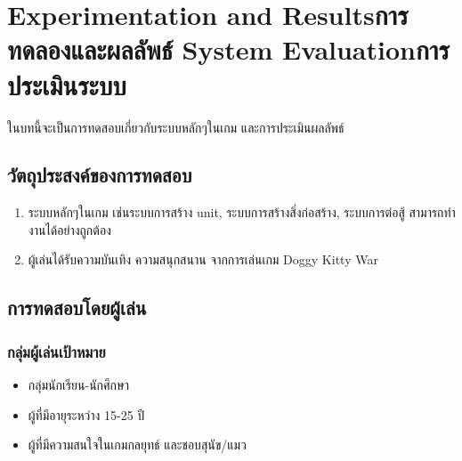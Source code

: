 \chapter{\ifproject%
\ifenglish Experimentation and Results\else การทดลองและผลลัพธ์\fi
\else%
\ifenglish System Evaluation\else การประเมินระบบ\fi
\fi}

\qquad ในบทนี้จะเป็นการทดสอบเกี่ยวกับระบบหลักๆในเกม และการประเมินผลลัพธ์

\section{วัตถุประสงค์ของการทดสอบ}
\begin{enumerate}
    \item ระบบหลักๆในเกม เช่นระบบการสร้าง unit, ระบบการสร้างสิ่งก่อสร้าง, ระบบการต่อสู้ สามารถทํางานได้อย่างถูกต้อง
    \item ผู้เล่นได้รับความบันเทิง ความสนุกสนาน จากการเล่นเกม Doggy Kitty War
\end{enumerate}

\section{การทดสอบโดยผู้เล่น}
\subsection{กลุ่มผู้เล่นเป้าหมาย}
\begin{itemize}
    \item กลุ่มนักเรียน-นักศึกษา
    \item ผู้ที่มีอายุระหว่าง 15-25 ปี
    \item ผู้ที่มีความสนใจในเกมกลยุทธ์ และชอบสุนัข/แมว
\end{itemize}
